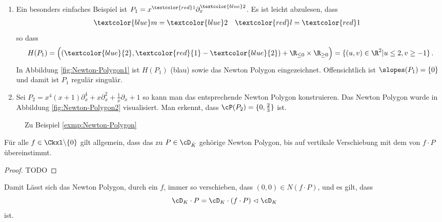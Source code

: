 \begin{exmp} \label{exmp:Newton-Polygon}
\begin{enumerate}
\item Ein besonders einfaches Beispiel ist
$P_1=x^{\textcolor{red}1}\partial_x^{\textcolor{blue}2}$.  Es ist leicht
abzulesen, dass
\begin{align*}
\textcolor{blue}m &= \textcolor{blue}2 &
\textcolor{red}l  &= \textcolor{red}1
\end{align*}
so dass
\[
H(P_1)=\Big( (\textcolor{blue}{2},\textcolor{red}{1}-\textcolor{blue}{2}) +
\R_{\leq 0}\times \R_{\geq 0} \Big) =\{(u,v)\in\R^2|u\leq 2, v\geq -1\} \,.
\]
In Abbildung \ref{fig:Newton-Polygon1} ist $H(P_1)$ (blau) sowie das Newton
Polygon eingezeichnet. Offensichtlich ist $\slopes(P_1)=\{0\}$ und damit ist
$P_1$ regulär singulär.
\item \cite[Bsp 5.3. 2.]{ZulaBarbara}
Sei $P_2=x^4(x+1)\partial_x^4+x\partial_x^2+\frac{1}{x}\partial_x+1$ so kann
man das entsprechende Newton Polygon konstruieren.
Das Newton Polygon wurde in Abbildung \ref{fig:Newton-Polygon2} visualisiert.
Man erkennt, dass $\cP(P_2)=\{0,\frac{2}{3}\}$ ist.
\end{enumerate}
\end{exmp}
\begin{figure}[H]
\label{fig:Newton-Polygon}
\caption{Zu Beispiel \ref{exmp:Newton-Polygon}}
\centering
\end{figure}

\begin{bem}
\cite[Bem 5.4]{ZulaBarbara}
Für alle $f\in \Ckxl \backslash \{0\}$ gilt allgemein, dass das zu $P\in
\cD_{\hat K}$ gehörige Newton Polygon, bis auf vertikale Verschiebung mit dem
von $f\cdot P$ übereinstimmt.
\end{bem}
\begin{proof}
TODO
\end{proof}
Damit Lässt sich das Newton Polygon, durch ein $f$, immer so verschieben, dass
$(0,0)\in N(f\cdot P)$, und es gilt, dass
\[
\cD_K\cdot P=\cD_K\cdot(f\cdot P) \vartriangleleft \cD_K
\]
ist.

